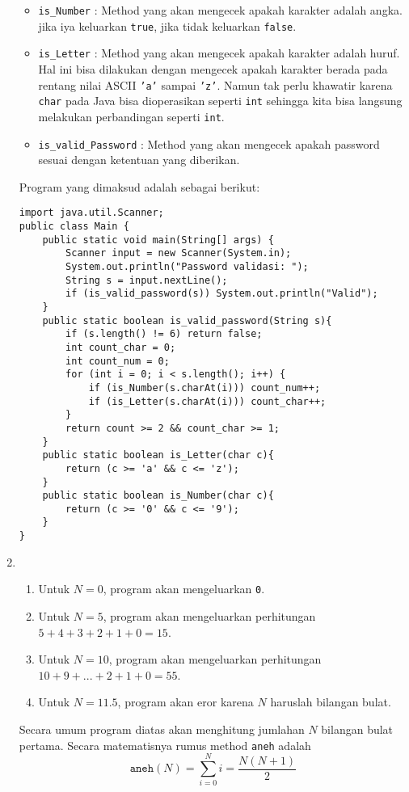 \documentclass[10pt,openany,a4paper]{article}
\begin{document}
\begin{enumerate}
    \begin{itemize}
        \item \texttt{is\_Number} : Method yang akan mengecek apakah karakter adalah angka. jika iya keluarkan \texttt{true}, jika tidak keluarkan \texttt{false}.
        \item \texttt{is\_Letter} : Method yang akan mengecek apakah karakter adalah huruf. Hal ini bisa dilakukan dengan mengecek apakah karakter berada pada rentang nilai ASCII \texttt{'a'} sampai \texttt{'z'}. Namun tak perlu khawatir karena \texttt{char} pada Java bisa dioperasikan seperti \texttt{int} sehingga kita bisa langsung melakukan perbandingan seperti \texttt{int}.
        \item \texttt{is\_valid\_Password} : Method yang akan mengecek apakah password sesuai dengan ketentuan yang diberikan. 
    \end{itemize}
    Program yang dimaksud adalah sebagai berikut:
    \begin{verbatim}
import java.util.Scanner;
public class Main {
    public static void main(String[] args) {
        Scanner input = new Scanner(System.in);
        System.out.println("Password validasi: ");
        String s = input.nextLine();
        if (is_valid_password(s)) System.out.println("Valid");
    }
    public static boolean is_valid_password(String s){
        if (s.length() != 6) return false;
        int count_char = 0;
        int count_num = 0;
        for (int i = 0; i < s.length(); i++) {
            if (is_Number(s.charAt(i))) count_num++;
            if (is_Letter(s.charAt(i))) count_char++;
        }
        return count >= 2 && count_char >= 1;
    }
    public static boolean is_Letter(char c){
        return (c >= 'a' && c <= 'z');
    }
    public static boolean is_Number(char c){
        return (c >= '0' && c <= '9');
    }
}
    \end{verbatim}

    \item \begin{enumerate}
        \item Untuk $N=0$, program akan mengeluarkan \texttt{0}. 
        \item Untuk $N=5$, program akan mengeluarkan perhitungan $5+4+3+2+1+0=15$.
        \item Untuk $N=10$, program akan mengeluarkan perhitungan $10+9+...+2+1+0=55$.
        \item Untuk $N=11.5$, program akan eror karena $N$ haruslah bilangan bulat.
    \end{enumerate}
    Secara umum program diatas akan menghitung jumlahan $N$ bilangan bulat pertama. Secara matematisnya rumus method \texttt{aneh} adalah
    \[\texttt{aneh}(N) = \sum_{i=0}^{N} i = \frac{N(N+1)}{2}\]


\end{enumerate}
\end{document}
